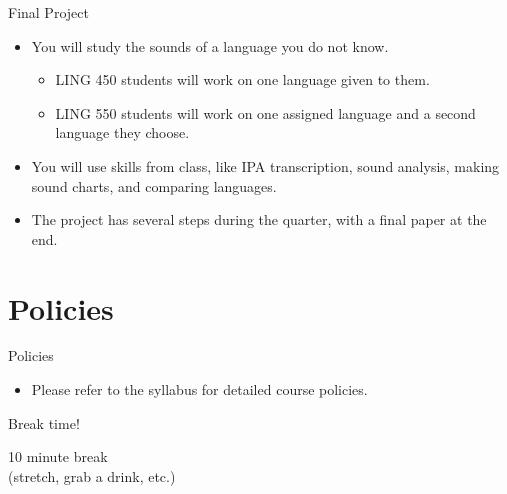 \documentclass{beamer}
\begin{document}
\begin{frame}{Final Project}
    \begin{itemize}
        \item You will study the sounds of a language you do not know.
            \begin{itemize}
                \item LING 450 students will work on one language given to them.
                \item LING 550 students will work on one assigned language and a second language they choose.
            \end{itemize}
        \item You will use skills from class, like IPA transcription, sound analysis, making sound charts, and comparing languages.
        \item The project has several steps during the quarter, with a final paper at the end.
    \end{itemize}
\end{frame}


\section{Policies}
\begin{frame}{Policies}
    \begin{itemize}
        \item Please refer to the syllabus for detailed course policies.
    \end{itemize}
\end{frame}

\begin{frame}{Break time!}
    \begin{center}
        \Huge 10 minute break \\ (stretch, grab a drink, etc.)
    \end{center}
\end{frame}



\end{document}
